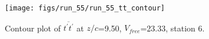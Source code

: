 \begin{figure}[H]
\centering
\texttt{[image: figs/run\_55/run\_55\_tt\_contour]}
\caption{Contour plot of $\overline{t^\prime t^\prime}$ at $z/c$=9.50, $V_{free}$=23.33, station 6.}
\label{fig:run_55_tt_contour}
\end{figure}


